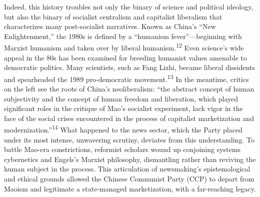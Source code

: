\documentclass{tufte-handout}
\begin{document}
Indeed, this history troubles not only the binary of science and
political ideology, but also the binary of socialist centralism and
capitalist liberalism that characterizes many post-socialist narratives.
Known as China's ``New Enlightenment,'' the 1980s is defined by a
``humanism fever''---beginning with Marxist humanism and taken over by
liberal humanism.\textsuperscript{12} Even science's wide appeal in the 80s has been examined for
breeding humanist values amenable to democratic politics. Many
scientists, such as Fang Lizhi, became liberal dissidents and
spearheaded the 1989 pro-democratic movement.\textsuperscript{13} In the
meantime, critics on the left see the roots of China's neoliberalism:
``the abstract concept of human subjectivity and the concept of human
freedom and liberation, which played significant roles in the critique
of Mao's socialist experiment, lack vigor in the face of the social
crises encountered in the process of capitalist marketization and
modernization.''\textsuperscript{14} What happened to
the news sector, which the Party placed under its most intense,
unwavering scrutiny, deviates from this understanding. To battle Mao-era
constrictions, reformist scholars wound up conjoining systems
cybernetics and Engels's Marxist philosophy, dismantling rather than
reviving the human subject in the process. This articulation of
newsmaking's epistemological and ethical grounds allowed the Chinese
Communist Party (CCP) to depart from Maoism and legitimate a
state-managed marketization, with a far-reaching legacy.
\end{document}
